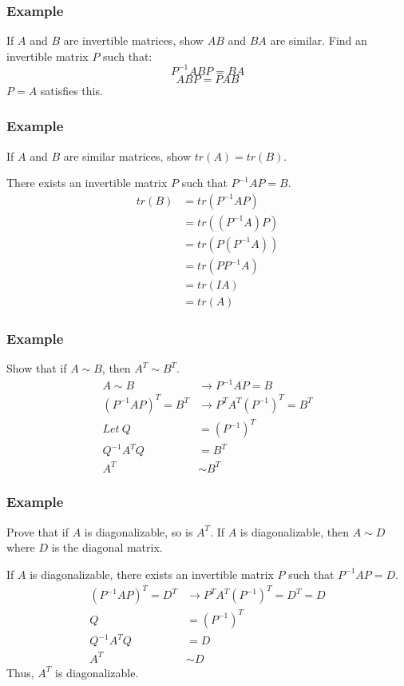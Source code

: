\documentclass{math}
\begin{document}
\subsubsection*{Example}
If \( A \) and \( B \) are invertible matrices, show \( AB \) and \( BA \) are
similar. Find an invertible matrix \( P \) such that:
\[ P^{-1}ABP = BA \]
\[ ABP = PAB \]
\( P = A \) satisfies this.

\subsubsection*{Example}
If \( A \) and \( B \) are similar matrices, show \( tr(A) = tr(B) \). \par
There exists an invertible matrix \( P \) such that \( P^{-1}AP = B \).
\begin{align*}
  tr(B) &= tr(P^{-1}AP) \\
  &= tr((P^{-1}A)P) \\
  &= tr(P(P^{-1}A)) \\
  &= tr(PP^{-1}A) \\
  &= tr(IA) \\
  &= tr(A)
\end{align*}

\subsubsection*{Example}
Show that if \( A\sim B \), then \( A^T\sim B^T \).
\begin{align*}
  A\sim B &\to P^{-1}AP = B \\
  (P^{-1}AP)^T = B^T &\to P^TA^T(P^{-1})^T = B^T \\
  Let~Q &= (P^{-1})^T \\
  Q^{-1}A^TQ &= B^T \\
  A^T &\sim B^T
\end{align*}

\subsubsection*{Example}
Prove that if \( A \) is diagonalizable, so is \( A^T \). If \( A \) is
diagonalizable, then \( A\sim D \) where \( D \) is the diagonal matrix.
\par
If \( A \) is diagonalizable, there exists an invertible matrix \( P \) such
that \( P^{-1}AP = D \).
\begin{align*}
  (P^{-1}AP)^T = D^T &\to P^TA^T(P^{-1})^T = D^T = D \\
  Q &= (P^{-1})^T \\
  Q^{-1}A^TQ &= D \\
  A^T &\sim D
\end{align*}
Thus, \( A^T \) is diagonalizable.
\end{document}
